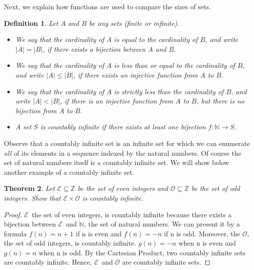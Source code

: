 \documentclass[12pt, a4paper]{article}
\theoremstyle{plain}
\newtheorem{theorem}{Theorem}[section]
\newtheorem{definition}[theorem]{Definition}
\begin{document}
Next, we explain how functions are used to compare the sizes of sets.

\begin{definition}\rm Let $A$ and $B$ be any sets (finite or infinite).
\begin{itemize}
    \item We say that the cardinality of $A$ is equal to the cardinality of $B$, and write $|A|=|B|$, if there exists a bijection between $A$ and $B$.
    
    \item We say that the cardinality of $A$ is less than or equal to the cardinality of $B$, and write $|A|\leq |B|$, if there exists an injective function from $A$ to $B$.
    
    \item We say that the cardinality of $A$ is strictly less than the cardinality of $B$, and write $|A|<|B|$, if there is an injective function from $A$ to $B$, but there is no bijection from $A$ to $B$. 
    
    \item A set $S$ is \textit{countably infinite} if there exists at least one bijection $f:\mathbb{N}\to S$.
\end{itemize}
\end{definition}



Observe that a countably infinite set is an infinite set for which we can enumerate \textit{all} of its elements in a sequence indexed by the natural numbers. Of course the set of natural numbers itself is a countably infinite set. We will show below another example of a countably infinite set.

\begin{theorem}
Let $ \mathcal{E}\subseteq \mathbb{Z}$ be the set of even integers and $\mathcal{O}\subseteq \mathbb{Z}$ be the set of odd integers. Show that $\mathcal{E}\times \mathcal{O}$ is countably infinite.
\end{theorem}



\begin{proof}
$\mathcal{E}$\, the set of even integers, is countably infinite because there exists a bijection between $\mathcal{E}$\ and $\mathbb{N}$, the set of natural numbers. We can present it by a formula $f(n)= {n+1}$ if n is even and $f(n)={-n}$ if n is odd.  Moreover, the $\mathcal{O}$, the set of odd integers, is countably infinite. $g(n) = {-n}$ when n is even and $g(n) = {n}$ when n is odd. By the Cartesian Product, two countably infinite sets are countably infinite. Hence, $\mathcal{E}$\ and $\mathcal{O}$ are countably infinite sets.  
\end{proof}
\end{document}
